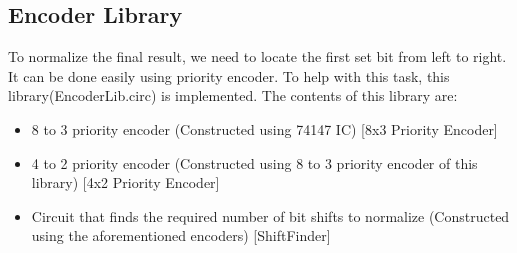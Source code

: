 \documentclass[12pt]{article}
\begin{document}
\subsection{Encoder Library}
To normalize the final result, we need to locate the first set bit from left to right. It can be done easily using priority encoder. To help with this task, this library(EncoderLib.circ) is implemented. The contents of this library are:
\begin{itemize}
    \item 8 to 3 priority encoder (Constructed using 74147 IC) [8x3 Priority Encoder]
    \item 4 to 2 priority encoder (Constructed using 8 to 3 priority encoder of this library) [4x2 Priority Encoder]
    \item Circuit that finds the required number of bit shifts to normalize (Constructed using the aforementioned encoders) [ShiftFinder]
\end{itemize}
\end{document}
